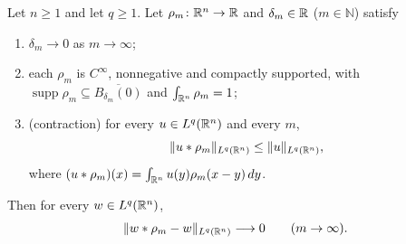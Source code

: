 \begin{helper}
Let $n\ge1$ and let $q\ge1$.  Let $\rho_m\colon\mathbb{R}^n\to\mathbb{R}$ and $\delta_m\in\mathbb{R}$
($m\in\mathbb{N}$) satisfy
\begin{enumerate}
\item $\delta_m\to0$ as $m\to\infty$;
\item each $\rho_m$ is $C^\infty$, nonnegative and compactly supported, with
  $\operatorname{supp}\rho_m\subseteq\overline{B_{\delta_m}(0)}$ and
  $\int_{\mathbb{R}^n}\rho_m=1$;
\item (contraction) for every $u\in L^q(\mathbb{R}^n)$ and every $m$,
  \[
  \|u*\rho_m\|_{L^q(\mathbb{R}^n)}\le\|u\|_{L^q(\mathbb{R}^n)} ,
  \]
  where $(u*\rho_m)(x)=\int_{\mathbb{R}^n}u(y)\rho_m(x-y)\,dy$.
\end{enumerate}
Then for every $w\in L^q(\mathbb{R}^n)$,
\[
\|w*\rho_m-w\|_{L^q(\mathbb{R}^n)}\longrightarrow0\qquad(m\to\infty).
\]
\end{helper}
